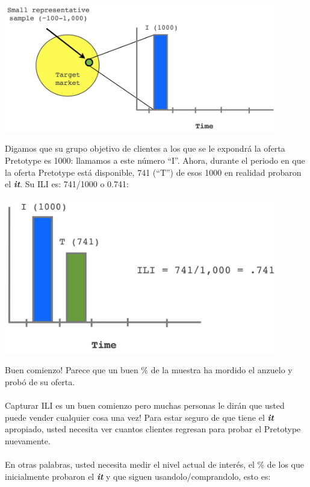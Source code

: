 \documentclass{article}
\begin{document}
\begin{center}
    \includegraphics[width=0.9\textwidth]{ILI_graph}
\end{center}

Digamos que su grupo objetivo de clientes a los que se le expondr\'a la oferta Pretotype es 1000: llamamos a este n\'umero ``I''.  Ahora, durante el periodo en que la oferta Pretotype est\'a disponible, 741 (``T'') de esos 1000 en realidad probaron el \textbf{\textit{it}}. Su ILI es: 741/1000 o 0.741:

\begin{center}
    \includegraphics[width=0.9\textwidth]{ILI_example}
\end{center}

Buen comienzo! Parece que un buen \% de la muestra ha mordido el anzuelo y prob\'o de su oferta.
\\ \\
Capturar ILI es un buen comienzo pero muchas personas le dir\'an que usted puede vender cualquier cosa una vez! Para estar seguro de que tiene el \textbf{\textit{it}} apropiado, usted necesita ver cuantos clientes regresan para probar el Pretotype nuevamente.
\\ \\
En otras palabras, usted necesita medir el nivel actual de inter\'es, el \% de los que inicialmente probaron el  \textbf{\textit{it}} y que siguen usandolo/comprandolo, esto es:
\end{document}
